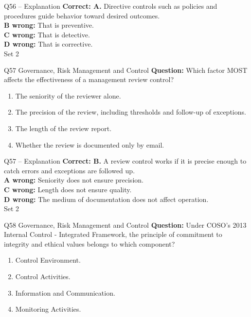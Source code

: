\documentclass[aspectratio=169,10pt]{beamer}
\begin{document}
\begin{frame}[t]{Q56 -- Explanation}
	\footnotesize
	\textbf{Correct: A.} Directive controls such as policies and procedures guide behavior toward desired outcomes. \\[5pt]
\textbf{B wrong:} That is preventive. \\[3pt]
\textbf{C wrong:} That is detective. \\[3pt]
\textbf{D wrong:} That is corrective. \\[3pt]
	\vfill {\tiny Set 2}
\end{frame}

\begin{frame}[t]{Q57 \hfill {\scriptsize Governance, Risk Management and Control}}
	\small
	\textbf{Question:} Which factor MOST affects the effectiveness of a management review control?
	\begin{enumerate}[label=\Alph*.,itemsep=1pt,topsep=3pt]
			\item The seniority of the reviewer alone.
			\item The precision of the review, including thresholds and follow-up of exceptions.
			\item The length of the review report.
			\item Whether the review is documented only by email.
	\end{enumerate}
\end{frame}

\begin{frame}[t]{Q57 -- Explanation}
	\footnotesize
	\textbf{Correct: B.} A review control works if it is precise enough to catch errors and exceptions are followed up. \\[5pt]
\textbf{A wrong:} Seniority does not ensure precision. \\[3pt]
\textbf{C wrong:} Length does not ensure quality. \\[3pt]
\textbf{D wrong:} The medium of documentation does not affect operation. \\[3pt]
	\vfill {\tiny Set 2}
\end{frame}

\begin{frame}[t]{Q58 \hfill {\scriptsize Governance, Risk Management and Control}}
	\small
	\textbf{Question:} Under COSO's 2013 Internal Control - Integrated Framework, the principle of commitment to integrity and ethical values belongs to which component?
	\begin{enumerate}[label=\Alph*.,itemsep=1pt,topsep=3pt]
			\item Control Environment.
			\item Control Activities.
			\item Information and Communication.
			\item Monitoring Activities.
	\end{enumerate}
\end{frame}
\end{document}
